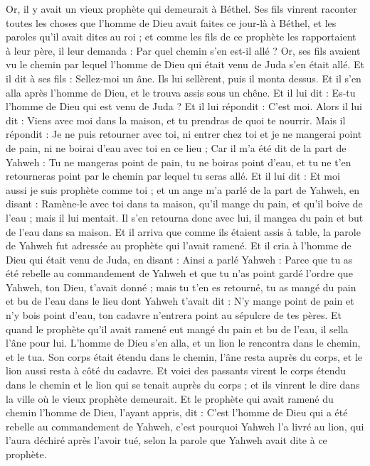 \begin{multicols}{2}
Or, il y avait un vieux prophète qui demeurait à Béthel. Ses fils vinrent raconter toutes les choses que l'homme de Dieu avait faites ce jour-là à Béthel, et les paroles qu'il avait dites au roi ; et comme les fils de ce prophète les rapportaient à leur père,
il leur demanda : Par quel chemin s'en est-il allé ? Or, ses fils avaient vu le chemin par lequel l'homme de Dieu qui était venu de Juda s'en était allé.
Et il dit à ses fils : Sellez-moi un âne. Ils lui sellèrent, puis il monta dessus.
Et il s'en alla après l'homme de Dieu, et le trouva assis sous un chêne. Et il lui dit : Es-tu l'homme de Dieu qui est venu de Juda ? Et il lui répondit : C'est moi.
Alors il lui dit : Viens avec moi dans la maison, et tu prendras de quoi te nourrir.
Mais il répondit : Je ne puis retourner avec toi, ni entrer chez toi et je ne mangerai point de pain, ni ne boirai d'eau avec toi en ce lieu ;
Car il m'a été dit de la part de Yahweh : Tu ne mangeras point de pain, tu ne boiras point d'eau, et tu ne t'en retourneras point par le chemin par lequel tu seras allé.
Et il lui dit : Et moi aussi je suis prophète comme toi ; et un ange m'a parlé de la part de Yahweh, en disant : Ramène-le avec toi dans ta maison, qu'il mange du pain, et qu'il boive de l'eau ; mais il lui mentait.
Il s'en retourna donc avec lui, il mangea du pain et but de l'eau dans sa maison.
Et il arriva que comme ils étaient assis à table, la parole de Yahweh fut adressée au prophète qui l'avait ramené.
Et il cria à l'homme de Dieu qui était venu de Juda, en disant : Ainsi a parlé Yahweh : Parce que tu as été rebelle au commandement de Yahweh et que tu n'as point gardé l’ordre que Yahweh, ton Dieu, t'avait donné ;
mais tu t'en es retourné, tu as mangé du pain et bu de l'eau dans le lieu dont Yahweh t'avait dit : N'y mange point de pain et n'y bois point d'eau, ton cadavre n'entrera point au sépulcre de tes pères.
Et quand le prophète qu'il avait ramené eut mangé du pain et bu de l’eau, il sella l’âne pour lui.
L’homme de Dieu s'en alla, et un lion le rencontra dans le chemin, et le tua. Son corps était étendu dans le chemin, l'âne resta auprès du corps, et le lion aussi resta à côté du cadavre.
Et voici des passants virent le corps étendu dans le chemin et le lion qui se tenait auprès du corps ; et ils vinrent le dire dans la ville où le vieux prophète demeurait.
Et le prophète qui avait ramené du chemin l'homme de Dieu, l'ayant appris, dit : C'est l'homme de Dieu qui a été rebelle au commandement de Yahweh, c'est pourquoi Yahweh l'a livré au lion, qui l'aura déchiré après l'avoir tué, selon la parole que Yahweh avait dite à ce prophète.

\end{multicols}
